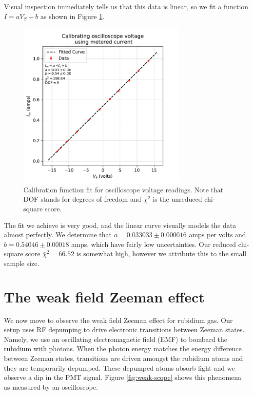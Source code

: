 \documentclass[12pt, letterpaper]{article}
\begin{document}
Visual inspection immediately tells us that this data is linear, so we fit a function $I = a V_S + b$ as shown in Figure \ref{fig:calibration}. 
\begin{figure}[!h]
    \centering
    \includegraphics[width=0.75\textwidth]{experiment4/figures/calibration.pdf}
    \caption{Calibration function fit for oscilloscope voltage readings. Note that DOF stands for degrees of freedom and $\chi^2$ is the unreduced chi-square score. }
    \label{fig:calibration}
\end{figure}
The fit we achieve is very good, and the linear curve visually models the data almost perfectly. We determine that $a = 0.033033 \pm 0.000016$ amps per volts and $b = 0.54046 \pm 0.00018$ amps, which have fairly low uncertainties. Our reduced chi-square score $\bar{\chi}^2 = 66.52$ is somewhat high, however we attribute this to the small sample size. 

\section{The weak field Zeeman effect} \label{sec:weak}

We now move to observe the weak field Zeeman effect for rubidium gas. Our setup uses RF depumping to drive electronic transitions between Zeeman states. Namely, we use an oscillating electromagnetic field (EMF) to bombard the rubidium with photons. When the photon energy matches the energy difference between Zeeman states, transitions are driven amongst the rubidium atoms and they are temporarily depumped. These depumped atoms absorb light and we observe a dip in the PMT signal. Figure \ref{fig:weak-scope} shows this phenomena as measured by an oscilloscope. 
\end{document}
